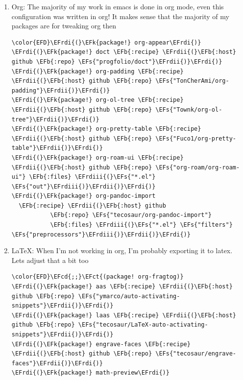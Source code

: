 \documentclass{scrartcl}
\newcommand{\EFk}[1]{\textcolor{EFk}{#1}} %
\newcommand{\EFs}[1]{\textcolor{EFs}{#1}} %
\newcommand{\EFb}[1]{\textcolor{EFb}{#1}} %
\newcommand{\EFct}[1]{\textcolor{EFct}{#1}} %
\newcommand{\EFcd}[1]{\textcolor{EFcd}{#1}} %
\newcommand{\EFrdi}[1]{\textcolor{EFrdi}{#1}} %
\newcommand{\EFrdii}[1]{\textcolor{EFrdii}{#1}} %
\newcommand{\EFrdiii}[1]{\textcolor{EFrdiii}{#1}} %
\begin{document}
\begin{enumerate}
\item Org:
\label{sec:org450bd80}
The majority of my work in emacs is done in org mode, even this configuration
was written in org! It makes sense that the majority of my packages are for
tweaking org then
\begin{Code}
\begin{Verbatim}[]
\color{EFD}\EFrdi{(}\EFk{package!} org-appear\EFrdi{)}
\EFrdi{(}\EFk{package!} doct \EFb{:recipe} \EFrdii{(}\EFb{:host} github \EFb{:repo} \EFs{"progfolio/doct"}\EFrdii{)}\EFrdi{)}
\EFrdi{(}\EFk{package!} org-padding \EFb{:recipe} \EFrdii{(}\EFb{:host} github \EFb{:repo} \EFs{"TonCherAmi/org-padding"}\EFrdii{)}\EFrdi{)}
\EFrdi{(}\EFk{package!} org-ol-tree \EFb{:recipe} \EFrdii{(}\EFb{:host} github \EFb{:repo} \EFs{"Townk/org-ol-tree"}\EFrdii{)}\EFrdi{)}
\EFrdi{(}\EFk{package!} org-pretty-table \EFb{:recipe} \EFrdii{(}\EFb{:host} github \EFb{:repo} \EFs{"Fuco1/org-pretty-table"}\EFrdii{)}\EFrdi{)}
\EFrdi{(}\EFk{package!} org-roam-ui \EFb{:recipe} \EFrdii{(}\EFb{:host} github \EFb{:repo} \EFs{"org-roam/org-roam-ui"} \EFb{:files} \EFrdiii{(}\EFs{"*.el"} \EFs{"out"}\EFrdiii{)}\EFrdii{)}\EFrdi{)}
\EFrdi{(}\EFk{package!} org-pandoc-import
  \EFb{:recipe} \EFrdii{(}\EFb{:host} github
           \EFb{:repo} \EFs{"tecosaur/org-pandoc-import"}
           \EFb{:files} \EFrdiii{(}\EFs{"*.el"} \EFs{"filters"} \EFs{"preprocessors"}\EFrdiii{)}\EFrdii{)}\EFrdi{)}
\end{Verbatim}
\end{Code}

\item \LaTeX:
\label{sec:org308a909}
When I'm not working in org, I'm probably exporting it to latex. Lets adjust
that a bit too
\begin{Code}
\begin{Verbatim}[]
\color{EFD}\EFcd{;;}\EFct{(package! org-fragtog)}
\EFrdi{(}\EFk{package!} aas \EFb{:recipe} \EFrdii{(}\EFb{:host} github \EFb{:repo} \EFs{"ymarco/auto-activating-snippets"}\EFrdii{)}\EFrdi{)}
\EFrdi{(}\EFk{package!} laas \EFb{:recipe} \EFrdii{(}\EFb{:host} github \EFb{:repo} \EFs{"tecosaur/LaTeX-auto-activating-snippets"}\EFrdii{)}\EFrdi{)}
\EFrdi{(}\EFk{package!} engrave-faces \EFb{:recipe} \EFrdii{(}\EFb{:host} github \EFb{:repo} \EFs{"tecosaur/engrave-faces"}\EFrdii{)}\EFrdi{)}
\EFrdi{(}\EFk{package!} math-preview\EFrdi{)}
\end{Verbatim}
\end{Code}


\end{enumerate}
\end{document}

